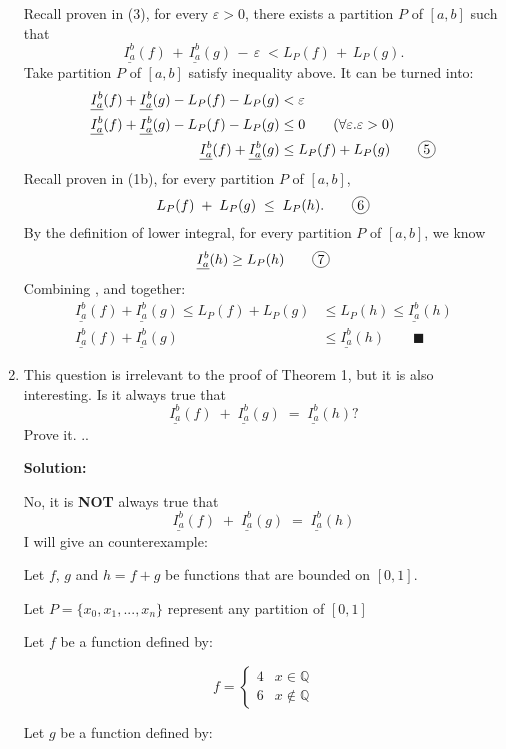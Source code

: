 \documentclass[12pt]{exam}
\newcommand*\circled[1]{\tikz[baseline=(char.base)]{
    \node[shape=circle, draw, inner sep=1pt, 
        minimum height=12pt] (char) {#1};}}
\newcommand{\Q}{\mathbb{Q}}
\newcommand{\e}{\varepsilon}
\begin{document}
\begin{enumerate}
	Recall proven in (3), for every $\e>0$, there exists a partition $P$ of $[a,b]$ such that
	$$
		\underline{I_a^b}(f) \, + \, \underline{I_a^b}(g) \, - \, \e \; < L_P(f) \, + \, L_P(g).
	$$
	Take partition $P$ of $[a,b]$ satisfy inequality above.
	It can be turned into:
	\begin{align*}
	    \underline{I_a^b}(f)+\underline{I_a^b}(g)-L_P(f)-L_P(g)&<\e\\
	    \underline{I_a^b}(f)+\underline{I_a^b}(g)-L_P(f)-L_P(g)&\leq 0\qquad( \forall \e. \e>0)\\
	    \underline{I_a^b}(f)+\underline{I_a^b}(g)&\leq L_P(f)+L_P(g)\qquad\circled{5}
	\end{align*}
	Recall proven in (1b), for every partition $P$ of $[a,b]$,
	$$
	    L_{P}(f) \; + \; L_P(g) \; \leq \; L_P(h).\qquad\circled{6}
	$$
	By the definition of lower integral, for every partition $P$ of $[a,b]$, we know
	$$
	    \underline{I_a^b}(h)\geq L_{P}(h)\qquad\circled{7}
	$$
	Combining \circled{5}, \circled{6} and \circled{7} together:
	\begin{align*}
	    \underline{I_a^b}(f)+\underline{I_a^b}(g)\leq L_P(f)+L_P(g)&\leq L_P(h)\leq\underline{I_a^b}(h)\\
	    \underline{I_a^b}(f)+\underline{I_a^b}(g)&\leq \underline{I_a^b}(h)\qquad\blacksquare
	\end{align*}

\item  This question is irrelevant to the proof of Theorem 1, but it is also interesting.  Is it always true that 
	$$
		\underline{I_a^b}(f) \; + \; \underline{I_a^b}(g) \; = \; \underline{I_a^b}(h)  ?
	$$
	Prove it.
	..
	
	
	\textbf{Solution:}
	
	No, it is \textbf{NOT} always true that
	$$
		\underline{I_a^b}(f) \; + \; \underline{I_a^b}(g) \; = \; \underline{I_a^b}(h)
	$$
	I will give an counterexample:
	
	Let $f$, $g$ and $h=f+g$ be functions that are bounded on $[0,1]$.
	
	Let $P=\{x_0,x_1,...,x_n\}$ represent any partition of $[0,1]$
	
	Let $f$ be a function defined by:
	
	\[
	    f = 
	    \begin{cases}
	        4 & x \in \Q \\
	        6 & x \notin \Q
	    \end{cases}
	\]
	
	Let $g$ be a function defined by:
	

\end{enumerate}
\end{document}
